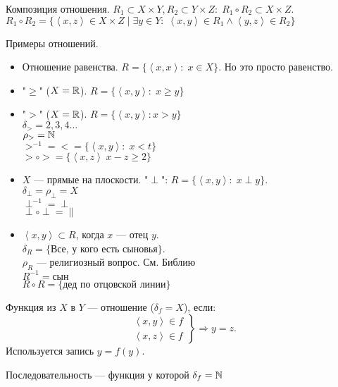 \begin{definition}
    Композиция отношения. $R_1 \subset X \times Y, R_2 \subset Y \times Z: \; R_1 \circ R_2 \subset X \times Z$. \\
    $R_1 \circ R_2 = \{\left<x, z\right> \in X \times Z\; \vert \; \exists y \in Y: \; \left<x,y\right> \in R_1 \land \left<y,z\right> \in R_2\}$
\end{definition}
Примеры отношений. \begin{itemize}
    \item Отношение равенства. $R = \{\left<x,x\right>: \; x \in X\}$. Но это просто равенство.
    \item "$\ge$" ($X = \mathbb{R}$). $R = \{ \left<x,y\right>: \; x \ge y\}$
    \item "$>$" ($X= \mathbb{R}$). $R = \{\left<x,y\right>: x > y\}$ \\
        $\delta_{>} = {2,3,4\ldots}$\\
        $\rho_> = \mathbb{N}$\\
        $>^{-1} = < = \{\left<x,y\right>: \; x < t\}$ \\
        $> \circ > = \{\left<x,z\right>\; x-z\ge2\}$
    \item $X$ --- прямые на плоскости. "$\perp$":  $R = \{\left<x,y\right>: \; x \perp y\}$. \\
            $\delta_\perp = \rho_\perp = X$ \\
            $\perp^{-1} = \perp$\\
            $\perp \circ \perp = \|$
    \item $\left<x, y\right> \subset R$, когда  $x$ --- отец  $y$. \\ 
        $\delta_R = \{\text{Все, у кого есть сыновья}\}$. \\
        $\rho_R$ --- религиозный вопрос. См. Библию \\
        $R^{-1} = \text{сын}$ \\
        $R \circ R = \{\text{дед по отцовской линии}\}$
\end{itemize}
\begin{definition}
    Функция из $X$ в  $Y$ --- отношение ($\delta_f = X$), если:
     \[
         \left. \begin{array}{l} \left<x,y\right> \in f \\ \left<x, z\right> \in f \end{array} \right\} \Rightarrow y = z
    .\] 
    Используется запись $y = f(y)$.
\end{definition}
\begin{definition}
    Последовательность --- функция у которой $\delta_f = \mathbb{N}$
\end{definition}
